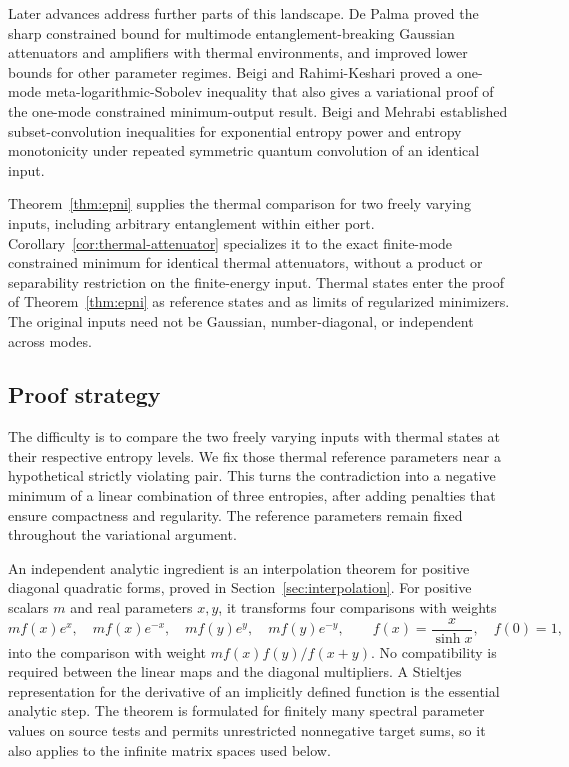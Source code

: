 Later advances address further parts of this landscape. De Palma
\cite{DP2019} proved the sharp constrained bound for multimode
entanglement-breaking Gaussian attenuators and amplifiers with thermal
environments, and
improved lower bounds for other parameter regimes. Beigi and
Rahimi-Keshari \cite{BeigiRahimiKeshari2025} proved a one-mode
meta-logarithmic-Sobolev inequality that also gives a variational proof of
the one-mode constrained minimum-output result. Beigi and Mehrabi
\cite{BeigiMehrabi2026} established subset-convolution inequalities for
exponential entropy power and entropy monotonicity under repeated
symmetric quantum convolution of an identical input.

Theorem~\ref{thm:epni} supplies the thermal comparison for two freely
varying inputs, including arbitrary entanglement within either port.
Corollary~\ref{cor:thermal-attenuator} specializes it to the exact
finite-mode constrained minimum for identical thermal attenuators,
without a product or separability restriction on the finite-energy input.
Thermal states enter the proof of Theorem~\ref{thm:epni} as reference states and as limits of
regularized minimizers. The original inputs need not be Gaussian,
number-diagonal, or independent across modes.

\subsection{Proof strategy}
The difficulty is to compare the two freely varying inputs with thermal
states at their respective entropy levels. We fix those thermal reference
parameters near a hypothetical strictly violating pair. This turns the
contradiction into a negative minimum of a linear combination of three
entropies, after adding penalties that ensure compactness and regularity.
The reference parameters remain fixed throughout the variational argument.

An independent analytic ingredient is an interpolation theorem for positive diagonal quadratic forms, proved in Section~\ref{sec:interpolation}. For positive scalars $m$ and real parameters $x,y$, it transforms four comparisons with weights
\[
 mf(x)e^{x},\quad mf(x)e^{-x},\quad
 mf(y)e^{y},\quad mf(y)e^{-y},
 \qquad f(x)=\frac{x}{\sinh x},\quad f(0)=1,
\]
into the comparison with weight \(mf(x)f(y)/f(x+y)\). No compatibility is required between the linear maps and the diagonal multipliers. A Stieltjes representation for the derivative of an implicitly defined function is the essential analytic step. The theorem is formulated for finitely many spectral parameter values on source tests and permits unrestricted nonnegative target sums, so it also applies to the infinite matrix spaces used below.

